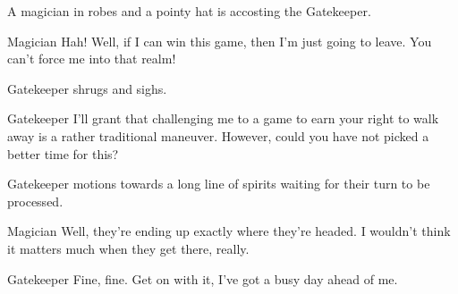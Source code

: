 A magician in robes and a pointy hat is accosting the Gatekeeper.

\begin{dialogue}{Magician}
Hah!
Well, if I can win this game, then I'm just going to leave.
You can't force me into that realm!
\end{dialogue}

Gatekeeper shrugs and sighs.

\begin{dialogue}{Gatekeeper}
I'll grant that challenging me to a game to earn your right to walk away is a rather traditional maneuver.
However, could you have not picked a better time for this?
\end{dialogue}

Gatekeeper motions towards a long line of spirits waiting for their turn to be processed.

\begin{dialogue}{Magician}
Well, they're ending up exactly where they're headed.
I wouldn't think it matters much when they get there, really.
\end{dialogue}

\begin{dialogue}[grumpily]{Gatekeeper}
Fine, fine.
Get on with it, I've got a busy day ahead of me.
\end{dialogue}

